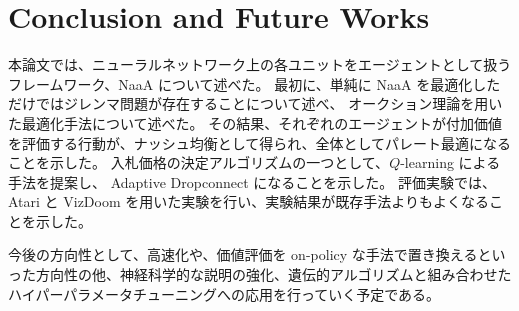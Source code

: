 \section{Conclusion and Future Works}
本論文では、ニューラルネットワーク上の各ユニットをエージェントとして扱うフレームワーク、NaaA について述べた。
最初に、単純に NaaA を最適化しただけではジレンマ問題が存在することについて述べ、
オークション理論を用いた最適化手法について述べた。
その結果、それぞれのエージェントが付加価値を評価する行動が、ナッシュ均衡として得られ、全体としてパレート最適になることを示した。
入札価格の決定アルゴリズムの一つとして、$Q$-learning による手法を提案し、
Adaptive Dropconnect になることを示した。
評価実験では、Atari と VizDoom を用いた実験を行い、実験結果が既存手法よりもよくなることを示した。

今後の方向性として、高速化や、価値評価を on-policy な手法で置き換えるといった方向性の他、神経科学的な説明の強化、遺伝的アルゴリズムと組み合わせたハイパーパラメータチューニングへの応用を行っていく予定である。
